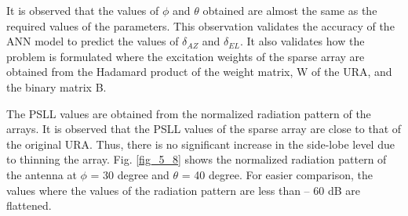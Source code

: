 \begin{table}[]
\caption{Some of the angles considered} \label{tab_5_1}
\centering
{}
\end{table}

It is observed that the values of $\phi$ and $\theta$ obtained are almost the same as the required values of the parameters. This observation validates the accuracy of the ANN model to predict the values of $\delta_{AZ}$ and $\delta_{EL}$. It also validates how the problem is formulated where the excitation weights of the sparse array are obtained from the Hadamard product of the weight matrix, W of the URA, and the binary matrix B.

The PSLL values are obtained from the normalized radiation pattern of the arrays. It is observed that the PSLL values of the sparse array are close to that of the original URA. Thus, there is no significant increase in the side-lobe level due to thinning the array. Fig. \ref{fig_5_8} shows the normalized radiation pattern of the antenna at $\phi$ = 30 degree and $\theta$ = 40 degree. For easier comparison, the values where the values of the radiation pattern are less than -- 60 dB are flattened.

